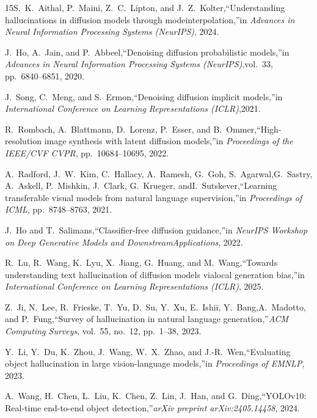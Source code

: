 \documentclass[conference]{IEEEtran}
\begin{document}
\begin{thebibliography}{15}S.~K.~Aithal, P.~Maini, Z.~C.~Lipton, and J.~Z.~Kolter,``Understanding hallucinations in diffusion models through modeinterpolation,''in \textit{Advances in Neural Information Processing Systems (NeurIPS)}, 2024.

J.~Ho, A.~Jain, and P.~Abbeel,``Denoising diffusion probabilistic models,''in \textit{Advances in Neural Information Processing Systems (NeurIPS)},vol.~33, pp.~6840--6851, 2020.

J.~Song, C.~Meng, and S.~Ermon,``Denoising diffusion implicit models,''in \textit{International Conference on Learning Representations (ICLR)},2021.

R.~Rombach, A.~Blattmann, D.~Lorenz, P.~Esser, and B.~Ommer,``High-resolution image synthesis with latent diffusion models,''in \textit{Proceedings of the IEEE/CVF CVPR}, pp.~10684--10695, 2022.

A.~Radford, J.~W.~Kim, C.~Hallacy, A.~Ramesh, G.~Goh, S.~Agarwal,G.~Sastry, A.~Askell, P.~Mishkin, J.~Clark, G.~Krueger, andI.~Sutskever,``Learning transferable visual models from natural language supervision,''in \textit{Proceedings of ICML}, pp.~8748--8763, 2021.

J.~Ho and T.~Salimans,``Classifier-free diffusion guidance,''in \textit{NeurIPS Workshop on Deep Generative Models and DownstreamApplications}, 2022.

R.~Lu, R.~Wang, K.~Lyu, X.~Jiang, G.~Huang, and M.~Wang,``Towards understanding text hallucination of diffusion models vialocal generation bias,''in \textit{International Conference on Learning Representations (ICLR)}, 2025.

Z.~Ji, N.~Lee, R.~Frieske, T.~Yu, D.~Su, Y.~Xu, E.~Ishii, Y.~Bang,A.~Madotto, and P.~Fung,``Survey of hallucination in natural language generation,''\textit{ACM Computing Surveys}, vol.~55, no.~12, pp.~1--38, 2023.

Y.~Li, Y.~Du, K.~Zhou, J.~Wang, W.~X.~Zhao, and J.-R.~Wen,``Evaluating object hallucination in large vision-language models,''in \textit{Proceedings of EMNLP}, 2023.

A.~Wang, H.~Chen, L.~Liu, K.~Chen, Z.~Lin, J.~Han, and G.~Ding,``YOLOv10: Real-time end-to-end object detection,''\textit{arXiv preprint arXiv:2405.14458}, 2024.


\end{thebibliography}
\end{document}
